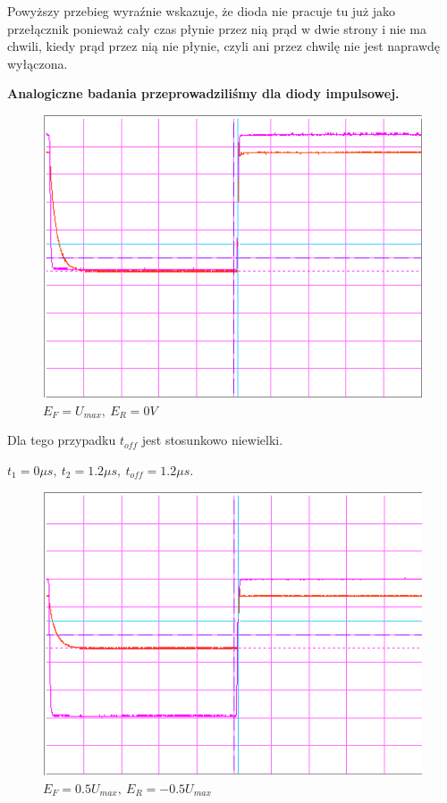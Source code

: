 \documentclass[a4paper,11pt]{article}
\begin{document}
Powyższy przebieg wyraźnie wskazuje, że dioda nie pracuje tu już jako przełącznik ponieważ cały czas płynie przez nią prąd w dwie strony i nie ma chwili, kiedy prąd przez nią nie płynie, czyli ani przez chwilę nie jest naprawdę wyłączona.

\textbf{Analogiczne badania przeprowadziliśmy dla diody impulsowej.}




\begin{figure} [H]
  \begin{center}
    \includegraphics{../Obrazki_i_tekst/obrobione/31asciety.png}
    \caption{\( E_F = U_{max}, \ E_R = 0V \)}
  \end{center}
\end{figure}

Dla tego przypadku \( t_{off} \) jest stosunkowo niewielki.

\(t_1 = 0 \mu s,\ t_2 = 1.2 \mu s,\ t_{off} = 1.2 \mu s \).

\begin{figure} [H]
  \begin{center}
    \includegraphics{../Obrazki_i_tekst/obrobione/31bsciety.png}
    \caption{\( E_F = 0.5 U_{max}, \ E_R = -0.5 U_{max}\)}
  \end{center}
\end{figure}
\end{document}
